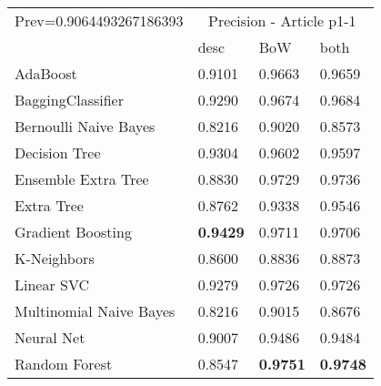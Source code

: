 \begin{tabular}{|l|l|l|l| }
\hline
Prev=0.9064493267186393 &  \multicolumn{3}{c|}{Precision - Article p1-1} \\
\cline{2-4} & desc & BoW & both \\ \hline
AdaBoost                & 0.9101 & 0.9663 & 0.9659\\
BaggingClassifier       & 0.9290 & 0.9674 & 0.9684\\
Bernoulli Naive Bayes   & 0.8216 & 0.9020 & 0.8573\\
Decision Tree           & 0.9304 & 0.9602 & 0.9597\\
Ensemble Extra Tree     & 0.8830 & 0.9729 & 0.9736\\
Extra Tree              & 0.8762 & 0.9338 & 0.9546\\
Gradient Boosting       & {\bf 0.9429} & 0.9711 & 0.9706\\
K-Neighbors             & 0.8600 & 0.8836 & 0.8873\\
Linear SVC              & 0.9279 & 0.9726 & 0.9726\\
Multinomial Naive Bayes & 0.8216 & 0.9015 & 0.8676\\
Neural Net              & 0.9007 & 0.9486 & 0.9484\\
Random Forest           & 0.8547 & {\bf 0.9751} & {\bf 0.9748}\\
\hline
\end{tabular}